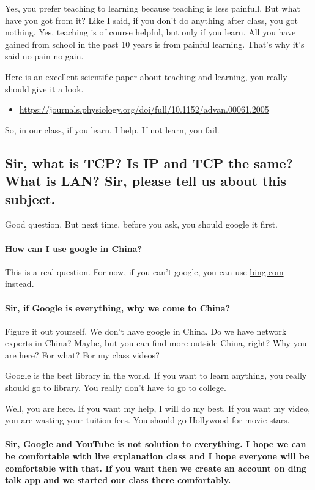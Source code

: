 \documentclass{article}
\begin{document}
Yes, you prefer teaching to learning because teaching is less painfull. But what have you
got from it? Like I said, if you don't do anything after class, you got nothing.  Yes,
teaching is of course helpful, but only if you learn. All you have gained from school in
the past 10 years is from painful learning. That's why it's said no pain no gain.

Here is an excellent scientific paper about teaching and learning, you really should give
it a look.
\begin{itemize}
\item \url{https://journals.physiology.org/doi/full/10.1152/advan.00061.2005}
\end{itemize}

So, in our class, if you learn, I help. If not learn, you fail.

\subsection[Google before ask?]{Sir, what is TCP? Is IP and TCP the same?  What is LAN? Sir, please tell us about this subject.}

Good question. But next time, before you ask, you should google it first.

\paragraph{How can I use google in China?}

This is a real question. For now, if you can't google, you can use \url{bing.com} instead.

\paragraph{Sir, if Google is everything, why we come to China?}

Figure it out yourself. We don't have google in China. Do we have network experts in
China? Maybe, but you can find more outside China, right? Why you are here?  For what? For
my class videos?

Google is the best library in the world. If you want to learn anything, you really should
go to library. You really don't have to go to college.

Well, you are here. If you want my help, I will do my best. If you want my video, you are
wasting your tuition fees. You should go Hollywood for movie stars.

\paragraph{Sir, Google and YouTube is not solution to everything. I hope we can be
  comfortable with live explanation class and I hope everyone will be comfortable with
  that. If you want then we create an account on ding talk app and we started our class
  there comfortably.}
\end{document}
